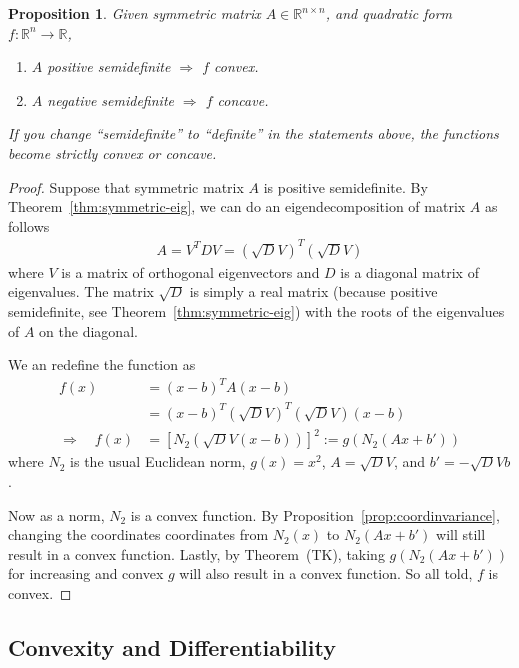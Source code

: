 \documentclass[12pt]{article}
\numberwithin{equation}{section} %
\theoremstyle{plain}
\newtheorem{prop}[thm]{Proposition}
\theoremstyle{definition}
\theoremstyle{remark}
\newcommand{\R}{\mathbb{R}}
\newcommand{\Rn}{\mathbb{R}^n}
\newcommand{\Rnn}{\mathbb{R}^{n\times n}}
\begin{document}
\begin{prop}
Given symmetric matrix $A\in\Rnn$, and quadratic form
$f:\Rn\rightarrow\R$,
\begin{enumerate}
  \item $A$ positive semidefinite $\Rightarrow$ $f$ convex.
  \item $A$ negative semidefinite $\Rightarrow$ $f$ concave.
\end{enumerate}
If you change ``semidefinite'' to ``definite'' in the statements above,
the functions become \emph{strictly} convex or concave.
\end{prop}
\begin{proof}
Suppose that symmetric matrix $A$ is positive semidefinite. By
Theorem~\ref{thm:symmetric-eig}, we can do an eigendecomposition of
matrix $A$ as follows
\begin{align*}
  A = V^T D V = \left(\sqrt{D}V\right)^T \left(\sqrt{D} V\right)
\end{align*}
where $V$ is a matrix of orthogonal eigenvectors and $D$ is a diagonal
matrix of eigenvalues. The matrix $\sqrt{D}$ is simply a real matrix
(because positive semidefinite, see
Theorem~\ref{thm:symmetric-eig}) with the roots of the
eigenvalues of $A$ on the diagonal.

We an redefine the function as
\begin{align*}
  f(x) &= (x-b)^T A (x-b) \\
  &= (x-b)^T \left(\sqrt{D}V\right)^T \left(\sqrt{D} V\right)(x-b) \\
  \Rightarrow\quad
  f(x)
  &= \left[N_2\left( \sqrt{D} V(x-b) \right)\right]^2
  := g(N_2(Ax+b'))
\end{align*}
where $N_2$ is the usual Euclidean norm, $g(x)=x^2$, $A=\sqrt{D}V$, and
$b'=-\sqrt{D}Vb$.

Now as a norm, $N_2$ is a convex function. By
Proposition~\ref{prop:coordinvariance}, changing the coordinates
coordinates from $N_2(x)$ to $N_2(Ax+b')$ will still result in a convex
function. Lastly, by Theorem~(TK), taking $g(N_2(Ax+b'))$ for increasing
and convex $g$ will also result in a convex function. So all told, $f$
is convex.
\end{proof}


\subsection{Convexity and Differentiability}
\end{document}
